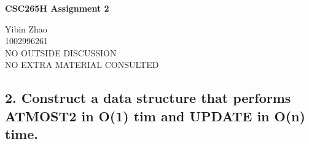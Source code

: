 \documentclass[10pt]{article}
\begin{document}
\begin{center}
{\bf \Large \bf CSC265H Assignment 2}\\
\end{center}

\noindent
Yibin Zhao\\
1002996261\\
NO OUTSIDE DISCUSSION\\
NO EXTRA MATERIAL CONSULTED\\

\begin{comment}
Consider a sequence A[1..n], each of whose entries is an element of $\{1,
\ldots, n^2\}$, that supports two operations:
	UPDATE(i, v), for $1 \leq i \leq n$ and $v \in \{1, \ldots, n^2\}$, which
	sets A[i] to v and 
	ATMOST2(i,j), for $1 \leq i < j \leq n$, which returns T if A[i..j]
	contains at most two different numbers and returns F is A[i..j] contains at
	least three different numbers.

1. Construct a data structure that performs both opertations in O(log n) time.

2. Construct a data structure that performs ATMOST2 in O(1) time and UPDATE in
O(n) time.

Both data stuctures must use O(n) words, each with O(log n bits.

For each data structure:
	a. Brirfly describe it and explain why it has the required space
	complexity.
	b. Draw a picture of it when A[1..8]= [2,3,2,2,2,1,3,1].
	c. Describe how to perform UPDATE.
	d. Explain why the UPDATE algorithm is correct.
	e. Explain ehy the UPDATE algorithm had the required time complexity.
	f. Describe how to perform ATMOST2.
	g. Explain why the ATMOST2 algorithm is correct.
	h. Explain why the ATMOST2 algorithm has the required time complexity.
\end{comment}

\subsection*{2. Construct a data structure that performs ATMOST2 in O(1) tim
and UPDATE in O(n) time.}
\end{document}

